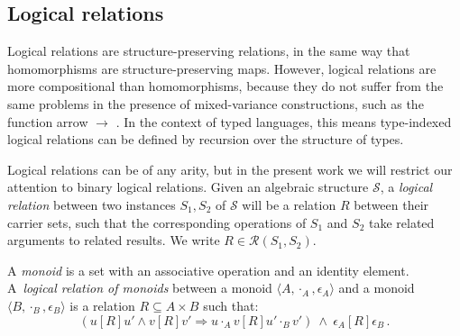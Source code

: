 \documentclass[sigplan,10pt,review,anonymous]{acmart}\settopmatter{printfolios=true,printccs=false,printacmref=false}
\newcommand{\ifr}[1]{\mathrel{[{#1}]}}
\begin{document}

\subsection{Logical relations} %

Logical relations are structure-preserving relations,
in the same way that homomorphisms are structure-preserving maps.
However,
logical relations are more compositional than homomorphisms,
because they do not suffer from the same problems
in the presence of mixed-variance constructions,
such as the function arrow $\rightarrow$ \cite{lrp}.
In the context of typed languages,
this means type-indexed logical relations
can be defined by recursion over the structure of types.


Logical relations can be of any arity,
but in the present work
we will restrict our attention to
binary logical relations.
Given an algebraic structure $\mathcal{S}$,
a \emph{logical relation}
between two instances $S_1, S_2$ of $\mathcal{S}$
will be a relation $R$
between their carrier sets,
such that the corresponding operations of $S_1$ and $S_2$
take related arguments to related results.
We write $R \in \mathcal{R}(S_1, S_2)$.

\begin{example}
\label{ex:monoid}
A \emph{monoid} is a set with
an associative operation and
an identity element.
A~\emph{logical relation of monoids} between
a monoid $\langle A, \cdot_A, \epsilon_A \rangle$ and
a monoid $\langle B, \cdot_B, \epsilon_B \rangle$
is a relation $R \subseteq A \times B$
such that:
\[
(u \ifr{R} u' \wedge v \ifr{R} v' \Rightarrow u \cdot_A v \ifr{R} u' \cdot_B v')
\: \wedge \:
\epsilon_A \ifr{R} \epsilon_B \,.
\]
\end{example}
\end{document}
